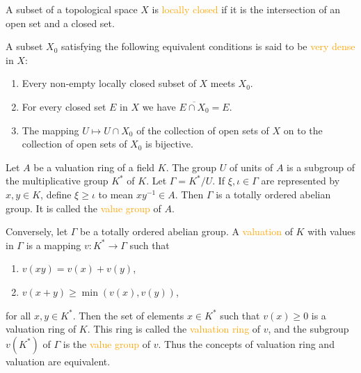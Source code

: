 \begin{definition}
	A subset of a topological space $X$ is \textcolor{orange}{locally closed} if it is the intersection of an open set and a closed set.
	
	A subset $X_0$ satisfying the following equivalent conditions is said to be \textcolor{orange}{very dense} in $X$:
	\begin{enumerate}[label=\textup{(\arabic*)}]
		\item Every non-empty locally closed subset of $X$ meets $X_0$.
		\item For every closed set $E$ in $X$ we have $\overline{E\cap X_0}=E$.
		\item The mapping $U\mapsto U\cap X_0$ of the collection of open sets of $X$ on to the collection of open sets of $X_0$ is bijective.
	\end{enumerate}
\end{definition}

\begin{definition}
	Let $A$ be a valuation ring of a field $K$. The group $U$ of units of $A$ is a subgroup of the multiplicative group $K^*$ of $K$. Let $\Gamma=K^*/U$. If $\xi,\iota\in\Gamma$ are represented by $x,y\in K$, define $\xi\geqslant\iota$ to mean $xy^{-1}\in A$. Then $\Gamma$ is a totally ordered abelian group. It is called the \textcolor{orange}{value group} of $A$.
	
	Conversely, let $\Gamma$ be a totally ordered abelian group. A \textcolor{orange}{valuation} of $K$ with values in $\Gamma$ is a mapping $v:K^*\rightarrow\Gamma$ such that
	\begin{enumerate}[label=\textup{(\arabic*)}]
		\item $v(xy)=v(x)+v(y)$,
		\item $v(x+y)\geqslant\operatorname{min}(v(x),v(y))$,
	\end{enumerate}
	for all $x,y\in K^*$. Then the set of elements $x\in K^*$ such that $v(x)\geqslant0$ is a valuation ring of $K$. This ring is called the \textcolor{orange}{valuation ring} of $v$, and the subgroup $v(K^*)$ of $\Gamma$ is the \textcolor{orange}{value group} of $v$. Thus the concepts of valuation ring and valuation are equivalent.
\end{definition}